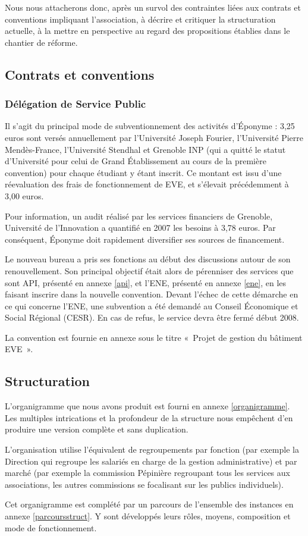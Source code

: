 Nous nous attacherons donc, après un survol des contraintes liées aux contrats
et conventions impliquant l'association, à décrire et critiquer la
structuration actuelle, à la mettre en perspective au regard des propositions
établies dans le chantier de réforme.

\subsection{Contrats et conventions}
\label{contrats}

\subsubsection{Délégation de Service Public}

Il s'agit du principal mode de subventionnement des activités d'Éponyme :
3,25 euros sont versés annuellement par l'Université Joseph Fourier,
l'Université Pierre Mendès-France, l'Université Stendhal et Grenoble INP
(qui a quitté le statut d'Université pour celui de Grand Établissement
 au cours de la première convention) pour chaque étudiant y étant inscrit.
Ce montant est issu d'une réevaluation des frais de fonctionnement de EVE,
et s'élevait précédemment à 3,00 euros.

Pour information, un audit réalisé par les services financiers de Grenoble,
Université de l'Innovation a quantifié en 2007 les besoins à 3,78 euros.
Par conséquent, Éponyme doit rapidement diversifier ses sources de financement.

Le nouveau bureau a pris ses fonctions au début des discussions autour de
son renouvellement. Son principal objectif était alors de pérenniser des
services que sont API, présenté en annexe \ref{api}, et l'ENE, présenté en annexe \ref{ene},
en les faisant inscrire dans la nouvelle
convention. Devant l'échec de cette démarche en ce qui concerne l'ENE, une
subvention a été demandé au Conseil Économique et Social Régional (CESR).
En cas de refus, le service devra être fermé début 2008.

La convention est fournie en annexe sous le titre
«~Projet de gestion du bâtiment EVE~».

\subsection{Structuration}
\label{structuration}

L'organigramme que nous avons produit est fourni en annexe \ref{organigramme}.
Les multiples intrications et la profondeur de la structure nous empêchent
d'en produire une version complète et sans duplication.

L'organisation utilise l'équivalent de regroupements par fonction (par exemple
la Direction qui regroupe les salariés en charge de la gestion administrative)
et par marché (par exemple la commission Pépinière regroupant tous les services
aux associations, les autres commissions se focalisant sur les publics
individuels).

Cet organigramme est complété par un parcours de l'ensemble des instances en
annexe \ref{parcoursstruct}. Y sont développés leurs rôles, moyens,
composition et mode de fonctionnement.